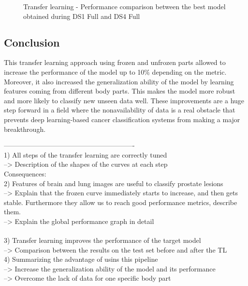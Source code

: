 \begin{figure}[!h]
\centering
\noindent
{}
\caption{Transfer learning - Performance comparison between the best model obtained during DS1 Full and DS4 Full}
\label{fig:tl_results_test_set}
\end{figure}


\subsection{Conclusion}
This transfer learning approach using frozen and unfrozen parts allowed to increase the performance of the model up to 10\% depending on the metric. Moreover, it also increased the generalization ability of the model by learning features coming from different body parts. This makes the model more robust and more likely to classify new unseen data well. These improvements are a huge step forward in a field where the nonavailability of data is a real obstacle that prevents deep learning-based cancer classification systems from making a major breakthrough.


----------------------------------------------------------\\
1) All steps of the transfer learning are correctly tuned\\
	--> Description of the shapes of the curves at each step \\

Consequences:\\	
2) Features of brain and lung images are useful to classify prostate lesions\\
	--> Explain that the frozen curve immediately starts to increase, and then gets stable. Furthermore they allow us to reach good performance metrics, describe them.\\
	--> Explain the global performance graph in detail\\\\
3) Transfer learning improves the performance of the target model\\
 --> Comparison between the results on the test set before and after the TL\\
 
 4) Summarizing the advantage of usins this pipeline \\
 --> Increase the generalization ability of the model and its performance\\
 --> Overcome the lack of data for one specific body part
 